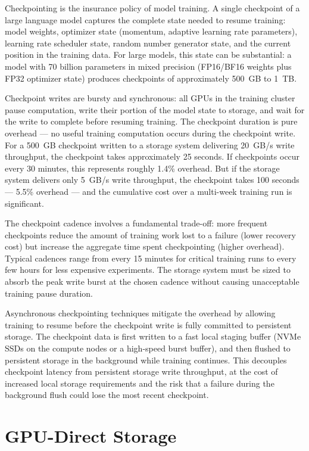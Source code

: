Checkpointing is the insurance policy of model training. A single checkpoint
of a large language model captures the complete state needed to resume
training: model weights, optimizer state (momentum, adaptive learning rate
parameters), learning rate scheduler state, random number generator state, and
the current position in the training data. For large models, this state can be
substantial: a model with 70 billion parameters in mixed precision (FP16/BF16
weights plus FP32 optimizer state) produces checkpoints of approximately
500~GB to 1~TB.

Checkpoint writes are bursty and synchronous: all GPUs in the training cluster
pause computation, write their portion of the model state to storage, and wait
for the write to complete before resuming training. The checkpoint duration is
pure overhead --- no useful training computation occurs during the checkpoint
write. For a 500~GB checkpoint written to a storage system delivering
20~GB/s write throughput, the checkpoint takes approximately 25 seconds. If
checkpoints occur every 30 minutes, this represents roughly 1.4\% overhead.
But if the storage system delivers only 5~GB/s write throughput, the
checkpoint takes 100 seconds --- 5.5\% overhead --- and the cumulative cost
over a multi-week training run is significant.

The checkpoint cadence involves a fundamental trade-off: more frequent
checkpoints reduce the amount of training work lost to a failure (lower
recovery cost) but increase the aggregate time spent checkpointing (higher
overhead). Typical cadences range from every 15 minutes for critical training
runs to every few hours for less expensive experiments. The storage system
must be sized to absorb the peak write burst at the chosen cadence without
causing unacceptable training pause duration.

Asynchronous checkpointing techniques mitigate the overhead by allowing
training to resume before the checkpoint write is fully committed to
persistent storage. The checkpoint data is first written to a fast local
staging buffer (NVMe SSDs on the compute nodes or a high-speed burst buffer),
and then flushed to persistent storage in the background while training
continues. This decouples checkpoint latency from persistent storage write
throughput, at the cost of increased local storage requirements and the risk
that a failure during the background flush could lose the most recent
checkpoint.

\section{GPU-Direct Storage}

